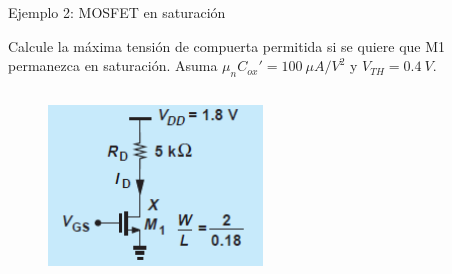 \documentclass[t,aspectratio=169,10pt]{beamer}
\begin{document}
\begin{frame}{Ejemplo 2: MOSFET en saturación}

Calcule la máxima tensión de compuerta permitida si se quiere que M1 permanezca en saturación. Asuma $\mu_n C_{ox}' = 100\ \mu{}A/V^2$ y $V_{TH} = 0.4\ V$.

\begin{columns}

\begin{column}{0.5\textwidth}

\begin{figure}[H]
    \centering
    \includegraphics[width=0.7\textwidth]{figuras/mosfet_ejemplo_2.png}
\end{figure}

\end{column}

\begin{column}{0.5\textwidth}

\end{column}

\end{columns}
    
\end{frame}
\end{document}
